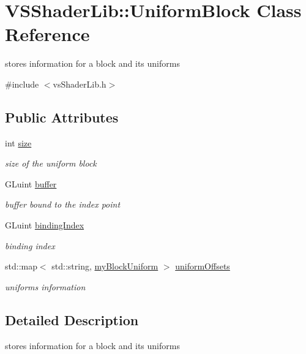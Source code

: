 \hypertarget{class_v_s_shader_lib_1_1_uniform_block}{}\section{V\+S\+Shader\+Lib\+:\+:Uniform\+Block Class Reference}
\label{class_v_s_shader_lib_1_1_uniform_block}


stores information for a block and its uniforms  




{\ttfamily \#include $<$vs\+Shader\+Lib.\+h$>$}

\subsection*{Public Attributes}
\begin{DoxyCompactItemize}
\item 
int \hyperlink{class_v_s_shader_lib_1_1_uniform_block_a71d5bc23b4f834a62391daf8f655b97d}{size}
\begin{DoxyCompactList}\small\item\em size of the uniform block \end{DoxyCompactList}\item 
G\+Luint \hyperlink{class_v_s_shader_lib_1_1_uniform_block_a61db2ec3b1ac47ac0198f99b28ea8bfd}{buffer}
\begin{DoxyCompactList}\small\item\em buffer bound to the index point \end{DoxyCompactList}\item 
G\+Luint \hyperlink{class_v_s_shader_lib_1_1_uniform_block_a1694ff57ebbee6c2cc3ce513cce84431}{binding\+Index}
\begin{DoxyCompactList}\small\item\em binding index \end{DoxyCompactList}\item 
std\+::map$<$ std\+::string, \hyperlink{class_v_s_shader_lib_a0543003357c93b57bfe99a9aa3e0898d}{my\+Block\+Uniform} $>$ \hyperlink{class_v_s_shader_lib_1_1_uniform_block_a94df01b8bf010f83a750d9807139c43f}{uniform\+Offsets}
\begin{DoxyCompactList}\small\item\em uniforms information \end{DoxyCompactList}\end{DoxyCompactItemize}


\subsection{Detailed Description}
stores information for a block and its uniforms 

